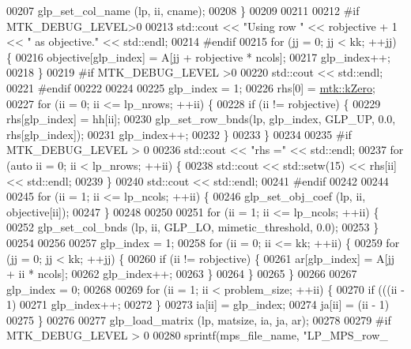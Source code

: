 \begin{DoxyCode}
{{00207     glp\_set\_col\_name (lp, ii, cname);
00208   \}
00209 
00211 
00212 \textcolor{preprocessor}{  #if MTK\_DEBUG\_LEVEL>0}
00213   std::cout << \textcolor{stringliteral}{"Using row "} << robjective + 1 << \textcolor{stringliteral}{" as objective."} << std::endl;
00214 \textcolor{preprocessor}{  #endif}
00215   \textcolor{keywordflow}{for} (jj = 0; jj < kk; ++jj) \{
00216     objective[glp\_index] = A[jj + robjective * ncols];
00217     glp\_index++;
00218   \}
00219 \textcolor{preprocessor}{  #if MTK\_DEBUG\_LEVEL >0}
00220   std::cout << std::endl;
00221 \textcolor{preprocessor}{  #endif}
00222 
00224 
00225   glp\_index = 1;
00226   rhs[0] = \hyperlink{group__c01-roots_ga59a451a5fae30d59649bcda274fea271}{mtk::kZero};
00227   \textcolor{keywordflow}{for} (ii = 0; ii <= lp\_nrows; ++ii) \{
00228     \textcolor{keywordflow}{if} (ii != robjective) \{
00229       rhs[glp\_index] = hh[ii];
00230       glp\_set\_row\_bnds(lp, glp\_index, GLP\_UP, 0.0, rhs[glp\_index]);
00231       glp\_index++;
00232     \}
00233   \}
00234 
00235 \textcolor{preprocessor}{  #if MTK\_DEBUG\_LEVEL > 0}
00236   std::cout << \textcolor{stringliteral}{"rhs ="} << std::endl;
00237   \textcolor{keywordflow}{for} (\textcolor{keyword}{auto} ii = 0; ii < lp\_nrows; ++ii) \{
00238     std::cout << std::setw(15) << rhs[ii] << std::endl;
00239   \}
00240   std::cout << std::endl;
00241 \textcolor{preprocessor}{  #endif}
00242 
00244 
00245   \textcolor{keywordflow}{for} (ii = 1; ii <= lp\_ncols; ++ii) \{
00246     glp\_set\_obj\_coef (lp, ii, objective[ii]);
00247   \}
00248 
00250 
00251   \textcolor{keywordflow}{for} (ii = 1; ii <= lp\_ncols; ++ii) \{
00252     glp\_set\_col\_bnds (lp, ii, GLP\_LO, mimetic\_threshold, 0.0);
00253   \}
00254 
00256 
00257   glp\_index = 1;
00258   \textcolor{keywordflow}{for} (ii = 0; ii <= kk; ++ii) \{
00259     \textcolor{keywordflow}{for} (jj = 0; jj < kk; ++jj) \{
00260       \textcolor{keywordflow}{if} (ii != robjective) \{
00261         ar[glp\_index] = A[jj + ii * ncols];
00262         glp\_index++;
00263       \}
00264     \}
00265   \}
00266 
00267   glp\_index = 0;
00268 
00269   \textcolor{keywordflow}{for} (ii = 1; ii < problem\_size; ++ii) \{
00270     \textcolor{keywordflow}{if} (((ii - 1) %
00271       glp\_index++;
00272     \}
00273     ia[ii] = glp\_index;
00274     ja[ii] = (ii - 1) %
00275   \}
00276 
00277   glp\_load\_matrix (lp, matsize, ia, ja, ar);
00278 
00279 \textcolor{preprocessor}{  #if MTK\_DEBUG\_LEVEL > 0}
00280   sprintf(mps\_file\_name, \textcolor{stringliteral}{"LP\_MPS\_row\_%
}}}
\end{DoxyCode}
